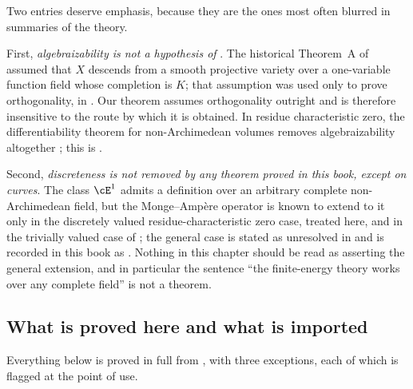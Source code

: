 Two entries deserve emphasis, because they are the ones most often blurred
in summaries of the theory.

First, \emph{algebraizability is not a hypothesis of
}.  The historical Theorem~A of \cite{BFJ15}
assumed that \(X\) descends from a smooth projective variety over a
one-variable function field whose completion is \(K\); that assumption was
used only to prove orthogonality, in \cite[Appendix~A]{BFJ15}.  Our theorem
assumes orthogonality outright and is therefore insensitive to the route by
which it is obtained.  In residue characteristic zero, the differentiability
theorem for non-Archimedean volumes removes algebraizability altogether
\cite[Theorem~6.3.3 and Corollary~6.3.4]{BGGJKM20}; this is
.

Second, \emph{discreteness is not removed by any theorem proved in this
book, except on curves}.  The class \(\cE^1\) admits a definition over an
arbitrary complete non-Archimedean field, but the Monge--Amp\`ere operator
is known to extend to it only in the discretely valued residue-characteristic
zero case, treated here, and in the trivially valued case of
; the general case is stated as unresolved in
\cite[Remark~4.4]{PS23Hybrid} and is recorded in this book as
.  Nothing in this chapter should be read as
asserting the general extension, and in particular the sentence ``the
finite-energy theory works over any complete field'' is not a theorem.

\subsection{What is proved here and what is imported}
\label{sec:ch28-imported}

Everything below is proved in full from
,
with three exceptions, each of which is flagged at the point of use.

